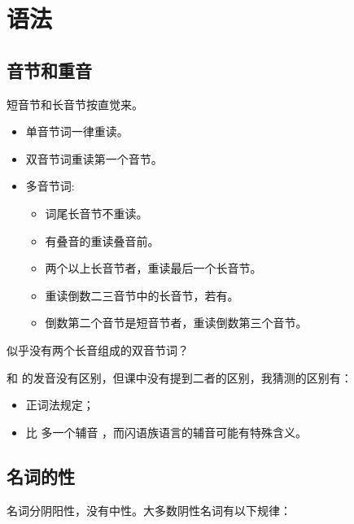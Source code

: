 \section{语法}

\subsection{ 音节和重音}

短音节和长音节按直觉来。

\begin{itemize}
    \item 单音节词一律重读。
    \item 双音节词重读第一个音节。
    \item 多音节词:
    \begin{itemize}
        \item 词尾长音节不重读。
        \item 有叠音的重读叠音前。
        \item 两个以上长音节者，重读最后一个长音节。
        \item 重读倒数二三音节中的长音节，若有。
        \item 倒数第二个音节是短音节者，重读倒数第三个音节。
    \end{itemize}
\end{itemize}

\begin{note}
    似乎没有两个长音组成的双音节词？
\end{note}

\begin{note}
     和  的发音没有区别，但课中没有提到二者的区别，我猜测的区别有：
    \begin{itemize}
        \item 正词法规定；
        \item {} 比  多一个辅音  ，而闪语族语言的辅音可能有特殊含义。
    \end{itemize}
\end{note}

\subsection{ 名词的性}

名词分阴阳性，没有中性。大多数阴性名词有以下规律：

